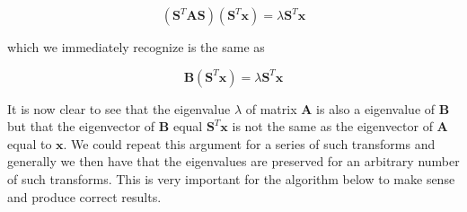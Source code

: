 \documentclass[12pt]{article}
\numberwithin{figure}{section}
\numberwithin{table}{section}
\begin{document}
\begin{equation}
	(\mathbf{S}^T \mathbf{A} \mathbf{S}) (\mathbf{S}^T \mathbf{x}) = \lambda \mathbf{S}^T \mathbf{x}
\end{equation}

\noindent which we immediately recognize is the same as 

\begin{equation}
	\mathbf{B} (\mathbf{S}^T \mathbf{x}) =  \lambda \mathbf{S}^T \mathbf{x}
\end{equation}

\noindent It is now clear to see that the eigenvalue $\lambda$ of matrix $\mathbf{A}$ is also a eigenvalue of $\mathbf{B}$ but that the eigenvector of $\mathbf{B}$ equal $\mathbf{S}^T \mathbf{x}$ is not the same as the eigenvector of $\mathbf{A}$ equal to $\mathbf{x}$. We could repeat this argument for a series of such transforms and generally we then have that the eigenvalues are preserved for an arbitrary number of such transforms. This is very important for the algorithm below to make sense and produce correct results. \\
\end{document}
